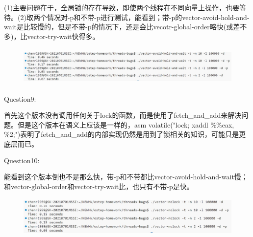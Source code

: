 \documentclass[12pt]{article}
\begin{document}
(1)主要问题在于，全局锁的存在导致，即使两个线程在不同向量上操作，也要等待。(2)取两个情况对-p和不带-p进行测试，能看到；带-p的vector-avoid-hold-and-wait是比较慢的，但是不带-p的情况下，还是会比vecotr-global-order略快(或差不多)，比vector-try-wait快得多。
\begin{figure}[H]
    \centering
    \includegraphics[height=2cm]{hw10-5.jpg}
\end{figure}
\begin{large}
    \noindent Question9:\par
\end{large}
首先这个版本没有调用任何关于lock的函数，而是使用了fetch\_and\_add来解决问题。但是这个版本在语义上应该是一样的，asm volatile("lock; xaddl \%\%eax, \%2;")表明了fetch\_and\_add的内部实现仍然是用到了锁相关的知识，可能只是更底层而已。\\
\begin{large}
    Question10:\par
\end{large}
能看到这个版本倒也不是那么快，带-p和不带都比vector-avoid-hold-and-wait慢；和vector-global-order和vector-try-wait比，也只有不带-p是快。
\begin{figure}[H]
    \centering
    \includegraphics[height=2cm]{hw10-6.jpg}
\end{figure}
\end{document}

